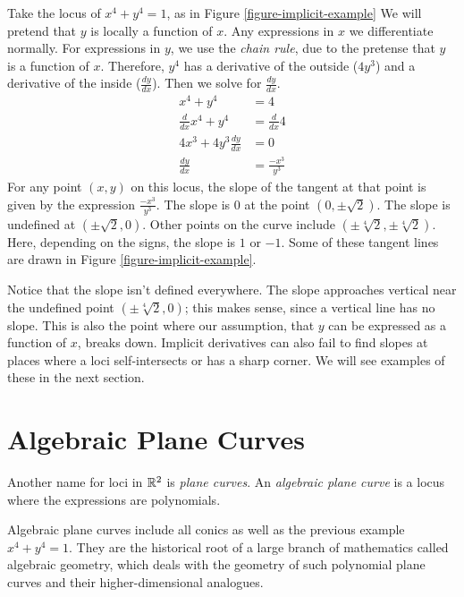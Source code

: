 \documentclass[fleqn]{report}
\begin{document}
\begin{example}
Take the locus of $x^4 + y^4 = 1$, as in
Figure \ref{figure-implicit-example}
We will pretend that $y$ is locally a function of $x$.
Any expressions in $x$ we differentiate normally. For
expressions in $y$, we use the \emph{chain rule}, due to
the pretense that $y$ is a
function of $x$. Therefore, $y^4$ has a
derivative of the outside ($4y^3$) and a derivative of the
inside ($\frac{dy}{dx}$). Then we solve for $\frac{dy}{dx}$.
\begin{align*}
x^4 + y^4 & = 4 \\
\frac{d}{dx} x^4 + y^4 & = \frac{d}{dx}4 \\
4x^3 + 4y^3 \frac{dy}{dx} & = 0 \\
\frac{dy}{dx} & = \frac{-x^3}{y^3} 
\end{align*}
For any point $(x,y)$ on this locus, the slope of the tangent
at that point is given by the expression $\frac{-x^3}{y^3}$.
The slope is $0$ at the point $(0, \pm \sqrt{2})$. The slope
is undefined at $(\pm \sqrt{2}, 0)$. Other points on the curve
include $(\pm \sqrt[4]{2}, \pm \sqrt[4]{2})$. Here, depending
on the signs, the slope is $1$ or $-1$. Some of these tangent
lines are drawn in Figure \ref{figure-implicit-example}.
\end{example}

Notice that the slope isn't defined everywhere. The slope
approaches vertical near the undefined point $(\pm
\sqrt[4]{2}, 0)$; this makes sense, since a vertical line has
no slope. This is also the point where our assumption, that
$y$ can be expressed as a function of $x$, breaks down.
Implicit derivatives can also fail to find slopes at places
where a loci self-intersects or has a sharp corner. We will
see examples of these in the next section.

\section{Algebraic Plane Curves}
\label{algebraic-plane-curves}

\begin{defn}
Another name for loci in $\mathbb{R}^2$ is \emph{plane curves}.
An \emph{algebraic plane curve} is a locus where the
expressions are polynomials.
\end{defn}

Algebraic plane curves include all conics as well as the
previous example $x^4 + y^4 = 1$. They are the historical root
of a large branch of mathematics called algebraic geometry,
which deals with the geometry of such polynomial plane curves
and their higher-dimensional analogues. 
\end{document}
